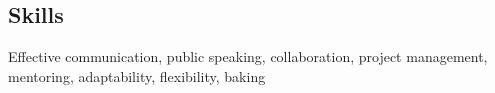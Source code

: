 \documentclass[margin,line]{resume}
\let\origsection\section%
\let\section\subsection%
\let\section\origsection%
\begin{document}
\begin{resume}
\section{\mysidestyle Skills}

Effective communication, public speaking, collaboration, project management, mentoring, adaptability, flexibility, baking

%
%
\end{resume}
\end{document}
